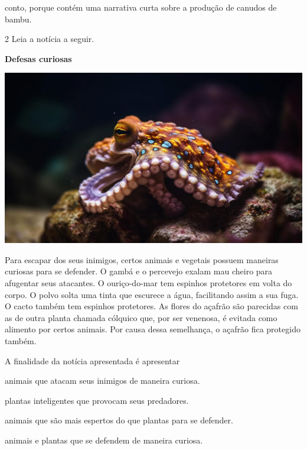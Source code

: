 \begin{conteudo}
\begin{conteudo}
\begin{conteudo}
\begin{conteudo}
\begin{escolha}
\item conto, porque contém uma narrativa curta sobre a produção de canudos de bambu.
\end{escolha}

\num{2} Leia a notícia a seguir.

\begin{myquote}
\textbf{Defesas curiosas}

\begin{center}
\noindent\includegraphics[width=.4\textwidth]{media/image20d.jpg}
\end{center}

Para escapar dos seus inimigos, certos animais e vegetais possuem
maneiras curiosas para se defender. O gambá e o percevejo exalam mau
cheiro para afugentar seus atacantes. O ouriço-do-mar tem espinhos
protetores em volta do corpo. O polvo solta uma tinta que escurece a
água, facilitando assim a sua fuga. O cacto também tem espinhos
protetores. As flores do açafrão são parecidas com as de outra planta
chamada cólquico que, por ser venenosa, é evitada como alimento por
certos animais. Por causa dessa semelhança, o açafrão fica protegido
também.

\end{myquote}

A finalidade da notícia apresentada é apresentar

\begin{escolha}
\item animais que atacam seus inimigos de maneira curiosa.

\item plantas inteligentes que provocam seus predadores.

\item animais que são mais espertos do que plantas para se defender.

\item animais e plantas que se defendem de maneira curiosa.
\end{escolha}


\end{conteudo}
\end{conteudo}
\end{conteudo}
\end{conteudo}
